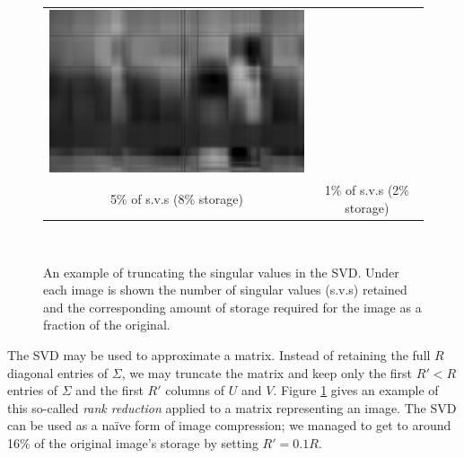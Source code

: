 \documentclass[a4paper]{article}
\begin{document}
\begin{figure}[p]
\begin{centering}
\begin{tabular}{cc}
      \includegraphics[width=0.4\columnwidth]{svd_1} \\
      5\% of s.v.s (8\% storage) & 1\% of s.v.s (2\% storage)\\[1em]
    \end{tabular} \\
  \end{centering}
  \caption{\label{fig:svd-truncation}An example of truncating the singular
  values in the SVD. Under each image is shown the number of singular values
  (s.v.s) retained and the corresponding amount of storage required for the
  image as a fraction of the original.}
\end{figure}

The SVD may be used to approximate a matrix. Instead of retaining the full $R$
diagonal entries of $\Sigma$, we may truncate the matrix and keep only the first
$R' < R$ entries of $\Sigma$ and the first $R'$ columns of $U$ and $V$. Figure
\ref{fig:svd-truncation} gives an example of this so-called \emph{rank
reduction} applied to a matrix representing an image. The SVD can be used as a
na\"ive form of image compression; we managed to get to around 16\% of the
original image's storage by setting $R' = 0.1 R$.
\end{document}
